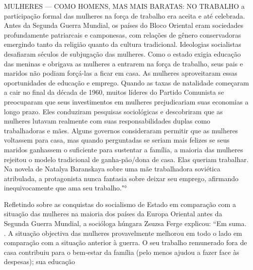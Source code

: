 MULHERES — COMO HOMENS, MAS MAIS BARATAS: NO TRABALHO a participação formal das mulheres na força de trabalho era aceita e até celebrada. Antes da Segunda Guerra Mundial, os países do Bloco Oriental eram sociedades profundamente patriarcais e camponesas, com relações de gênero conservadoras emergindo tanto da religião quanto da cultura tradicional. Ideologias socialistas desafiaram séculos de subjugação das mulheres. Como o estado exigia educação das meninas e obrigava as mulheres a entrarem na força de trabalho, seus pais e maridos não podiam forçá-las a ficar em casa. As mulheres aproveitaram essas oportunidades de educação e emprego. Quando as taxas de natalidade começaram a cair no final da década de 1960, muitos líderes do Partido Comunista se preocuparam que seus investimentos em mulheres prejudicariam suas economias a longo prazo. Eles conduziram pesquisas sociológicas e descobriram que as mulheres lutavam realmente com suas responsabilidades duplas como trabalhadoras e mães. Alguns governos consideraram permitir que as mulheres voltassem para casa, mas quando perguntadas se seriam mais felizes se seus maridos ganhassem o suficiente para sustentar a família, a maioria das mulheres rejeitou o modelo tradicional de ganha-pão/dona de casa. Elas queriam trabalhar. Na novela de Natalya Baranskaya sobre uma mãe trabalhadora soviética atribulada, a protagonista nunca fantasia sobre deixar seu emprego, afirmando inequivocamente que ama seu trabalho."°
 \par 
Refletindo sobre as conquistas do socialismo de Estado em comparação com a situação das mulheres na maioria dos países da Europa Oriental antes da Segunda Guerra Mundial, a socióloga húngara Zsuzsa Ferge explicou: “Em suma. . A situação objectiva das mulheres provavelmente melhorou em todo o lado em comparação com a situação anterior à guerra. O seu trabalho remunerado fora de casa contribuiu para o bem-estar da família (pelo menos ajudou a fazer face às despesas); sua educação
 \par 

